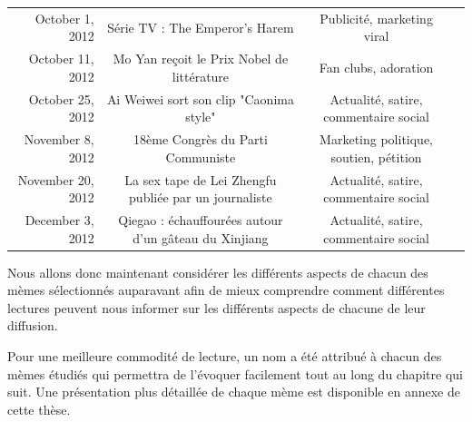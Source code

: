 \begin{landscape}
\begin{table}
\begin{tabulary}{\linewidth}{ r| C C C}
        October 1, 2012 &
        Série TV : The Emperor's Harem & 
        Publicité, marketing viral &
         \\

        October 11, 2012  &
        Mo Yan reçoit le Prix Nobel de littérature &
        Fan clubs, adoration  &
         \\

        October 25, 2012 &
        Ai Weiwei sort son clip "Caonima style"&
        Actualité, satire, commentaire social &
        \\

        November 8, 2012 &
        18ème Congrès du Parti Communiste &
        Marketing politique, soutien, pétition &
        \\

        November 20, 2012 &
        La sex tape de Lei Zhengfu publiée par un journaliste &
        Actualité, satire, commentaire social &
        \\

        December 3, 2012  &
        Qiegao : échauffourées autour d'un gâteau du Xinjiang &
        Actualité, satire, commentaire social &
        \\

    \end{tabulary}
\end{table}
\end{landscape}

Nous allons donc maintenant consid\'erer les diff\'erents aspects de chacun des m\`emes s\'electionn\'es auparavant afin de mieux comprendre comment diff\'erentes lectures peuvent nous informer sur les diff\'erents aspects de chacune de leur diffusion. 

Pour une meilleure commodit\'e de lecture, un nom a \'et\'e attribu\'e \`a chacun des m\`emes \'etudi\'es qui permettra de l{\textquoteright}\'evoquer facilement tout au long du chapitre qui suit. Une pr\'esentation plus d\'etaill\'ee de chaque m\`eme est disponible en annexe de cette th\`ese. 

